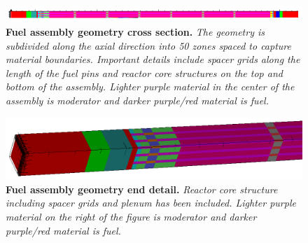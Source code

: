 \documentclass[letterpaper,12pt]{article}
\begin{document}
\begin{figure}[t!]
  \begin{center}
    \includegraphics[width=6.0in]{problem3_axial_mat.png}
  \end{center}
  \caption{\textbf{Fuel assembly geometry cross section.} \textit{The
      geometry is subdivided along the axial direction into 50 zones
      spaced to capture material boundaries. Important details include
      spacer grids along the length of the fuel pins and reactor core
      structures on the top and bottom of the assembly. Lighter purple
      material in the center of the assembly is moderator and darker
      purple/red material is fuel.}}
  \label{fig:problem3_axial_mat}
\end{figure}
\begin{figure}[t!]
  \begin{center}
    \includegraphics[width=6.0in]{problem3_end.png}
  \end{center}
  \caption{\textbf{Fuel assembly geometry end detail.}
    \textit{Reactor core structure including spacer grids and plenum
      has been included. Lighter purple material on the right of the
      figure is moderator and darker purple/red material is fuel.}}
  \label{fig:problem3_end}
\end{figure}
\end{document}
